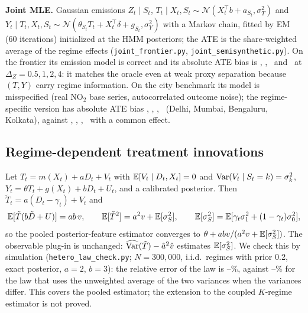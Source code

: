 \textbf{Joint MLE.} Gaussian emissions $Z_t\mid S_t$, $T_t\mid X_t,S_t\sim\mathcal N(X_t^\top b+a_{S_t},\sigma_T^2)$ and $Y_t\mid T_t,X_t,S_t\sim\mathcal N(\theta_{S_t}T_t+X_t^\top\delta+g_{S_t},\sigma_Y^2)$ with a Markov chain, fitted by EM (60 iterations) initialized at the HMM posteriors; the ATE is the share-weighted average of the regime effects (\texttt{joint\_frontier.py}, \texttt{joint\_semisynthetic.py}). On the frontier its emission model is correct and its absolute ATE bias is \RbJFHalf, \RbJFOne, \RbJFTwo\ and \RbJFFour\ at $\Delta_Z=0.5,1,2,4$: it matches the oracle even at weak proxy separation because $(T,Y)$ carry regime information. On the city benchmark its model is misspecified (real NO$_2$ base series, autocorrelated outcome noise); the regime-specific version has absolute ATE bias \RbJCityDelhi, \RbJCityMumbai, \RbJCityBengaluru, \RbJCityKolkata\ (Delhi, Mumbai, Bengaluru, Kolkata), against \RbJCommonCityDelhi, \RbJCommonCityMumbai, \RbJCommonCityBengaluru, \RbJCommonCityKolkata\ with a common effect.

\subsection{Regime-dependent treatment innovations}
Let $T_t=m(X_t)+aD_t+V_t$ with $\mathbb{E}[V_t\mid D_t,X_t]=0$ and $\mathrm{Var}(V_t\mid S_t=k)=\sigma_k^2$, $Y_t=\theta T_t+g(X_t)+bD_t+U_t$, and a calibrated posterior. Then $\tilde T_t=a(D_t-\gamma_t)+V_t$ and
\[
\mathbb{E}[\tilde T(b\tilde D+U)]=ab\,v,\qquad \mathbb{E}[\tilde T^2]=a^2v+\mathbb{E}[\sigma_S^2],\qquad \mathbb{E}[\sigma_S^2]=\mathbb{E}[\gamma_t\sigma_1^2+(1-\gamma_t)\sigma_0^2],
\]
so the pooled posterior-feature estimator converges to $\theta+abv/(a^2v+\mathbb{E}[\sigma_S^2])$. The observable plug-in is unchanged: $\widehat{\mathrm{Var}}(\tilde T)-\hat a^2\hat v$ estimates $\E[\sigma_S^2]$. We check this by simulation (\texttt{hetero\_law\_check.py}; $N=300{,}000$, i.i.d.\ regimes with prior 0.2, exact posterior, $a=2$, $b=3$): the relative error of the law is \RbHetErrMin--\RbHetErrMax\%, against \RbHomErrMin--\RbHomErrMax\% for the law that uses the unweighted average of the two variances when the variances differ. This covers the pooled estimator; the extension to the coupled $K$-regime estimator is not proved.
\begin{table}[h]\centering\footnotesize
\caption{Pooled bias with regime-dependent treatment innovations: measured bias, the law with $\E[\sigma_S^2]$, and the law with the unweighted average variance $\bar\sigma^2=(\sigma_0^2+\sigma_1^2)/2$ (\texttt{reports/rebuttal/hetero\_law\_check.csv}).}\label{tab:hetero}

\end{table}

